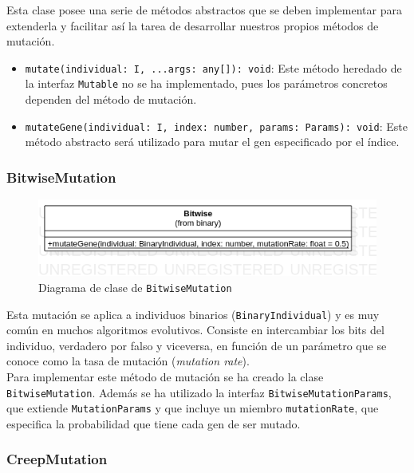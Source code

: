 Esta clase posee una serie de métodos abstractos que se deben implementar para extenderla y facilitar así la tarea de desarrollar nuestros propios métodos de mutación.

\begin{itemize}
    \item \texttt{mutate(individual: I, ...args: any[]): void}: Este método heredado de la interfaz \texttt{Mutable} no se ha implementado, pues los parámetros concretos dependen del método de mutación.
    \item \texttt{mutateGene(individual: I, index: number, params: Params): void}: Este método abstracto será utilizado para mutar el gen especificado por el índice.
\end{itemize}

\subsubsection{BitwiseMutation}

\begin{figure}[ht]
    \centering
    \includegraphics[scale=0.4]{mem/images/cap-4/4.2.7(Mutation)/Bitwise.png}
    \caption{Diagrama de clase de \texttt{BitwiseMutation}}
    \label{fig:my_label}
\end{figure}

Esta mutación se aplica a individuos binarios (\texttt{BinaryIndividual}) y es muy común en muchos algoritmos evolutivos. Consiste en intercambiar los bits del individuo, verdadero por falso y viceversa, en función de un parámetro que se conoce como la tasa de mutación (\textit{mutation rate}). \\

Para implementar este método de mutación se ha creado la clase \texttt{BitwiseMutation}. Además se ha utilizado la interfaz \texttt{BitwiseMutationParams}, que extiende \texttt{MutationParams} y que incluye un miembro \texttt{mutationRate}, que especifica la probabilidad que tiene cada gen de ser mutado.

\subsubsection{CreepMutation}

